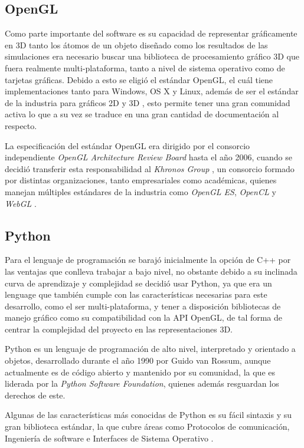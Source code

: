 \subsection{OpenGL}

Como parte importante del software es su capacidad de representar gráficamente en 3D tanto los átomos de un objeto diseñado como los resultados de las simulaciones era necesario buscar una biblioteca de procesamiento gráfico 3D que fuera realmente multi-plataforma, tanto a nivel de sistema operativo como de tarjetas gráficas. Debido a esto se eligió el estándar OpenGL, el cuál tiene implementaciones tanto para Windows, OS X y Linux, además de ser el estándar de la industria para gráficos 2D y 3D \citep{website:AboutOpenGL}, esto permite tener una gran comunidad activa lo que a su vez se traduce en una gran cantidad de documentación al respecto.

La especificación del estándar OpenGL era dirigido por el consorcio independiente \emph{OpenGL Architecture Review Board} hasta el año 2006, cuando se decidió transferir esta responsabilidad al \emph{Khronos Group} \citep{website:OpenGLARB}, un consorcio formado por distintas organizaciones, tanto empresariales como académicas, quienes manejan múltiples estándares de la industria como \emph{OpenGL ES}, \emph{OpenCL} y \emph{WebGL} \citep{website:KhronosGroup}.

\subsection{Python}

Para el lenguaje de programación se barajó inicialmente la opción de C++ por las ventajas que conlleva trabajar a bajo nivel, no obstante debido a su inclinada curva de aprendizaje y complejidad se decidió usar Python, ya que era un lenguage que también cumple con las características necesarias para este desarrollo, como el ser multi-plataforma, y tener a disposición bibliotecas de manejo gráfico como su compatibilidad con la API OpenGL, de tal forma de centrar la complejidad del proyecto en las representaciones 3D.

Python es un lenguaje de programación de alto nivel, interpretado y orientado a objetos, desarrollado durante el año 1990 por Guido van Rossum, aunque actualmente es de código abierto y mantenido por su comunidad, la que es liderada por la \emph{Python Software Foundation}, quienes además resguardan los derechos de este.

Algunas de las características más conocidas de Python es su fácil sintaxis y su gran biblioteca estándar, la que cubre áreas como Protocolos de comunicación, Ingeniería de software e Interfaces de Sistema Operativo \citep{pythonFeatures}.

